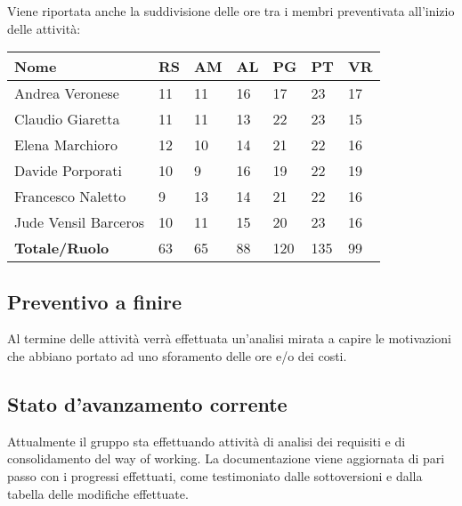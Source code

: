 \documentclass[12pt]{article}
\begin{document}
Viene riportata anche la suddivisione delle ore tra i membri preventivata all'inizio delle attività:
\begin{center}  
    \begin{tabular}{|l|l|l|l|l|l|l|}
        \hline
        \textbf{Nome} & \textbf{RS} & \textbf{AM} & \textbf{AL} & \textbf{PG} & \textbf{PT} & \textbf{VR}\\
        \hline
        Andrea Veronese & 11 & 11 & 16 & 17 & 23 & 17  \\
        \hline
        Claudio Giaretta & 11 & 11 & 13 & 22 & 23 & 15\\
        \hline
        Elena Marchioro & 12 & 10 & 14 & 21 & 22 & 16 \\
        \hline
        Davide Porporati & 10 & 9 & 16 & 19 & 22 & 19 \\
        \hline
        Francesco Naletto & 9 & 13 & 14 & 21 & 22 & 16 \\
        \hline
        Jude Vensil Barceros & 10 & 11 & 15 & 20 & 23 & 16 \\
        \hline
        \textbf{Totale/Ruolo} & 63 & 65 & 88 & 120 & 135 & 99 \\
        \hline
    \end{tabular}
\end{center}
\subsection{Preventivo a finire}
Al termine delle attività verrà effettuata un'analisi mirata a capire le motivazioni che abbiano portato ad uno sforamento delle ore e/o dei costi.
\subsection{Stato d'avanzamento corrente}
Attualmente il gruppo sta effettuando attività di analisi dei requisiti e di consolidamento del way of working. La documentazione viene aggiornata di pari passo con i progressi effettuati, come testimoniato dalle sottoversioni e dalla tabella delle modifiche effettuate.
\end{document}

